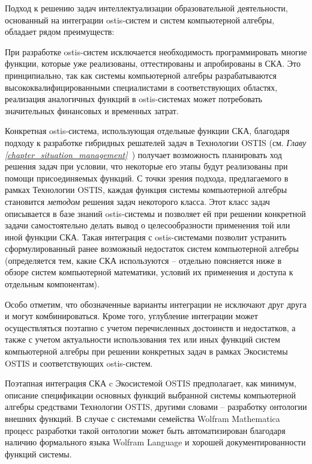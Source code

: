 Подход к решению задач интеллектуализации образовательной деятельности, основанный на интеграции ostis-систем и систем компьютерной алгебры, обладает рядом преимуществ:
\begin{textitemize}
	\item При разработке ostis-систем исключается необходимость программировать многие функции, которые уже реализованы, оттестированы и апробированы в СКА. Это принципиально, так как системы компьютерной алгебры разрабатываются высококвалифицированными специалистами в соответствующих областях, реализация аналогичных функций в ostis-системах может потребовать значительных финансовых и временных затрат.
	\item Конкретная ostis-система, использующая отдельные функции СКА, благодаря подходу к разработке гибридных решателей задач в Технологии OSTIS (см. \textit{Главу \ref{chapter_situation_management}~}) получает возможность  планировать ход решения задач при условии, что некоторые его этапы будут реализованы при помощи присоединяемых функций. С точки зрения подхода, предлагаемого в рамках Технологии OSTIS, каждая функция системы компьютерной алгебры становится \textit{методом} решения задач некоторого класса. Этот класс задач описывается в базе знаний ostis-системы и позволяет ей при решении конкретной задачи самостоятельно делать вывод о целесообразности применения той или иной функции СКА. Такая интеграция с ostis-системами позволит устранить сформулированный ранее возможный недостаток систем компьютерной алгебры (определяется тем, какие СКА используются -- отдельно поясняется ниже в обзоре систем компьютерной математики, условий их применения и доступа к отдельным компонентам).
\end{textitemize}

Особо отметим, что обозначенные варианты интеграции не исключают друг друга и могут комбинироваться. Кроме того, углубление интеграции может осуществляться поэтапно с учетом перечисленных достоинств и недостатков, а также с учетом актуальности использования тех или иных функций систем компьютерной алгебры при решении конкретных задач в рамках Экосистемы OSTIS и соответствующих ostis-систем.

Поэтапная интеграция СКА c Экосистемой OSTIS предполагает, как минимум, описание спецификации основных функций выбранной системы компьютерной алгебры средствами Технологии OSTIS, другими словами -- разработку онтологии внешних функций. В случае с системами семейства Wolfram Mathematica процесс разработки такой онтологии может быть автоматизирован благодаря наличию формального языка Wolfram Language и хорошей документированности функций системы.

